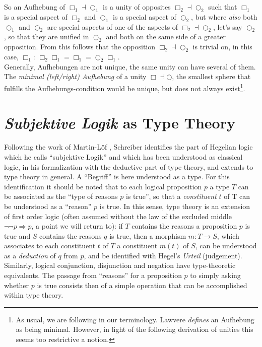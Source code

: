 \documentclass{article}
\begin{document}
So an Aufhebung of $\Box_1\dashv\bigcirc_1$ is a unity of opposites $\Box_2\dashv\bigcirc_2$ such that $\Box_1$ is a special aspect of $\Box_2$ and $\bigcirc_1$ is a special aspect of $\bigcirc_2$, but where \emph{also} both $\bigcirc_1$ and $\bigcirc_2$ are special aspects of one of the aspects of $\Box_2\dashv\bigcirc_2$, let's say $\bigcirc_2$, so that they are unified in $\bigcirc_2$ and both on the same side of a greater opposition. From this follows that the opposition $\Box_2\dashv\bigcirc_2$ is trivial on, in this case, $\Box_1$: $\Box_2\Box_1=\Box_1=\bigcirc_2\Box_1$. \\

Generally, Aufhebungen are not unique, the same unity can have several of them. The \emph{minimal (left/right) Aufhebung} of a unity $\Box\dashv\bigcirc$, the smallest sphere that fulfills the Aufhebungs-condition would be unique, but does not always exist\footnote{As usual, we are following \cite{nlabsol} in our terminology. Lawvere \emph{defines} an Aufhebung as being minimal\cite{Lawvere92}. However, in light of the following derivation of unities this seems too restrictive a notion.}.


\section{\emph{Subjektive Logik} as Type Theory}
Following the work of Martin-Löf \cite{Loef96}, Schreiber identifies the part of Hegelian logic which he calls ``subjektive Logik'' and which has been understood as classical logic, in his formalization with the deductive part of type theory, and extends to type theory in general. A ``Begriff'' is here understood as a type. For this identification it should be noted that to each logical proposition $p$ a type $T$ can be associated as the ``type of reasons $p$ is true'', so that a \emph{constituent} $t$ of T can be understood as a ``reason'' $p$ is true. In this sense, type theory is an extension of first order logic (often assumed without the law of the excluded middle $\neg\neg p \Rightarrow p$, a point we will return to): if $T$ contains the reasons a proposition $p$ is true and $S$ contains the reasons $q$ is true, then a morphism $m:T\rightarrow S$, which associates to each constituent $t$ of $T$ a constituent $m(t)$ of $S$, can be understood as a \emph{deduction} of $q$ from $p$, and be identified with Hegel's \emph{Urteil} (judgement). Similarly, logical conjunction, disjunction and negation have type-theoretic equivalents. The passage from ``reasons'' for a proposition $p$ to simply asking whether $p$ is true consists then of a simple operation that can be accomplished within type theory. \\
\end{document}
